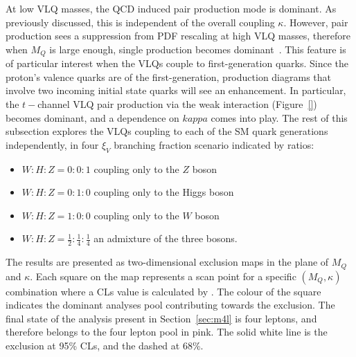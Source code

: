 At low VLQ masses, the QCD induced pair production mode is dominant. As previously discussed, this is independent of the overall coupling $\kappa$. However, pair production sees a suppression from PDF rescaling at high VLQ masses, therefore when $M_Q$ is large enough, single production becomes dominant~\cite{Panizzi:2014dwa}. This feature is of particular interest when the VLQs couple to first-generation quarks. Since the proton's valence quarks are of the first-generation, production diagrams that involve two incoming initial state quarks will see an enhancement. In particular, the $t-$channel VLQ pair production via the weak interaction (Figure~\ref{}) becomes dominant, and a dependence on $kappa$ comes into play. 
The rest of this subsection explores the VLQs coupling to each of the SM quark generations independently, in four $\xi_V$ branching fraction scenario indicated by ratios: 
\begin{itemize}
	\item{$W:H:Z=0:0:1$ coupling only to the $Z$ boson}
	\item{$W:H:Z=0:1:0$ coupling only to the Higgs boson}
	\item{$W:H:Z=1:0:0$ coupling only to the $W$ boson}
	\item{$W:H:Z=\frac{1}{2}:\frac{1}{4}:\frac{1}{4}$ an admixture of the three bosons}.
\end{itemize}
The results are presented as two-dimensional exclusion maps in the plane of $M_Q$ and $\kappa$. Each square on the map represents a scan point for a specific $(M_Q,\kappa)$ combination where a CLs value is calculated by \contur. The colour of the square indicates the dominant analyses pool contributing towards the exclusion. The final state of the \ATLAS analysis present in Section~\ref{sec:m4l} is four leptons, and therefore belongs to the four lepton pool in pink. The solid white line is the exclusion at 95\% CLs, and the dashed at 68\%. 

